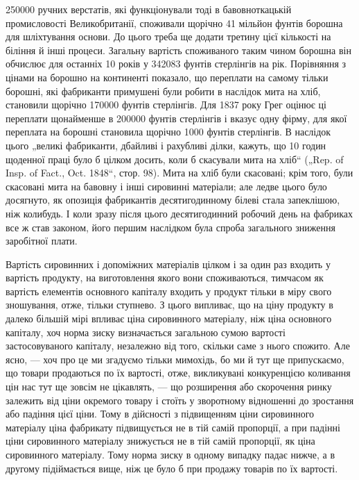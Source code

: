 \parcont{}  %
250000 ручних верстатів, які функціонували тоді в бавовноткацькій
промисловості Великобританії, споживали щорічно 41 мільйон
фунтів борошна для шліхтування основи. До цього треба
ще додати третину цієї кількості на біління й інші процеси.
Загальну вартість споживаного таким чином борошна він обчислює
для останніх 10 років у 342083 фунтів стерлінгів на рік.
Порівняння з цінами на борошно на континенті показало, що
переплати на самому тільки борошні, які фабриканти примушені
були робити в наслідок мита на хліб, становили щорічно
170000 фунтів стерлінгів. Для 1837 року Грег оцінює ці
переплати щонайменше в 200000 фунтів стерлінгів і вказує
одну фірму, для якої переплата на борошні становила щорічно
1000 фунтів стерлінгів. В наслідок цього „великі фабриканти,
дбайливі і рахубливі ділки, кажуть, що 10 годин щоденної
праці було б цілком досить, коли б скасували мита на хліб“
(„Rep. of Insp. of Fact., Oct. 1848“, стор. 98). Мита на хліб
були скасовані; крім того, були скасовані мита на бавовну
і інші сировинні матеріали; але ледве цього було досягнуто, як
опозиція фабрикантів десятигодинному білеві стала запеклішою,
ніж колибудь. І коли зразу після цього десятигодинний робочий
день на фабриках все ж став законом, його першим наслідком
була спроба загального зниження заробітної плати.

Вартість сировинних і допоміжних матеріалів цілком і за один
раз входить у вартість продукту, на виготовлення якого вони споживаються,
тимчасом як вартість елементів основного капіталу
входить у продукт тільки в міру свого зношування, отже, тільки
ступнево. З цього випливає, що на ціну продукту в далеко більшій
мірі впливає ціна сировинного матеріалу, ніж ціна основного
капіталу, хоч норма зиску визначається загальною сумою вартості
застосовуваного капіталу, незалежно від того, скільки
саме з нього спожито. Але ясно, — хоч про це ми згадуємо
тільки мимохідь, бо ми й тут ще припускаємо, що товари продаються
по їх вартості, отже, викликувані конкуренцією коливання
цін нас тут ще зовсім не цікавлять, — що розширення або
скорочення ринку залежить від ціни окремого товару і стоїть
у зворотному відношенні до зростання або падіння цієї ціни.
Тому в дійсності з підвищенням ціни сировинного матеріалу ціна
фабрикату підвищується не в тій самій пропорції, а при падінні
ціни сировинного матеріалу знижується не в тій самій пропорції,
як ціна сировинного матеріалу. Тому норма зиску в
одному випадку падає нижче, а в другому підіймається вище,
ніж це було б при продажу товарів по їх вартості.

